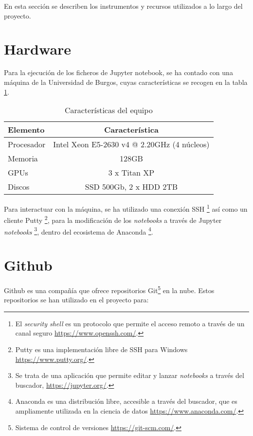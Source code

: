  \label{capitulo4}

En esta sección se describen los instrumentos y recursos utilizados a lo largo del proyecto. 

\section{Hardware} \label{Hardware}

Para la ejecución de los ficheros de Jupyter notebook, se ha contado con una máquina de la Universidad de Burgos, cuyas características se recogen en la tabla \ref{caracteristicaspc}.

\begin{table}[h!]
\begin{tabular}{l c}
Elemento & Característica \\
\hline
Procesador & Intel Xeon E5-2630 v4 @ 2.20GHz (4 núcleos)\\
Memoria & 128GB\\
GPUs & 3 x Titan XP\\
Discos & SSD 500Gb, 2 x HDD 2TB\\
\end{tabular}
\caption{\label{caracteristicaspc} Características del equipo}
\end{table}

Para interactuar con la máquina, se ha utilizado una conexión SSH \footnote{El \textit{security shell} es un protocolo que permite el acceso remoto a través de un canal seguro \url{https://www.openssh.com/}.} así como un cliente Putty \footnote{Putty es una implementación libre de SSH para Windows \url{https://www.putty.org/}.}, para la modificación de los \textit{notebooks} a través de Jupyter \textit{notebooks} \footnote{Se trata de una aplicación que permite editar y lanzar \textit{notebooks} a través del buscador, \url{https://jupyter.org/}.}, dentro del ecosistema de Anaconda \footnote{Anaconda es una distribución libre, accesible a través del buscador, que es ampliamente utilizada en la ciencia de datos \url{https://www.anaconda.com/}.}.

\section{Github}

Github es una compañía que ofrece repositorios Git\footnote{Sistema de control de versiones \url{https://git-scm.com/}.} en la nube. 
Estos repositorios se han utilizado en el proyecto para:

